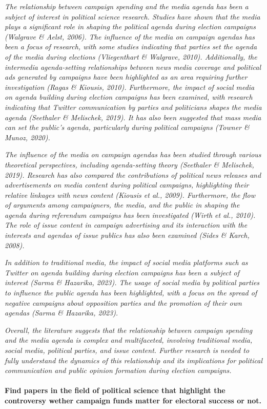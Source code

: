 \documentclass[11pt,a4paper]{article}
\begin{document}
\textit{The relationship between campaign spending and the media agenda has been a subject of interest in political science research. Studies have shown that the media plays a significant role in shaping the political agenda during election campaigns (Walgrave \& Aelst, 2006). The influence of the media on campaign agendas has been a focus of research, with some studies indicating that parties set the agenda of the media during elections (Vliegenthart \& Walgrave, 2010). Additionally, the intermedia agenda-setting relationships between news media coverage and political ads generated by campaigns have been highlighted as an area requiring further investigation (Ragas \& Kiousis, 2010). Furthermore, the impact of social media on agenda building during election campaigns has been examined, with research indicating that Twitter communication by parties and politicians shapes the media agenda (Seethaler \& Melischek, 2019). It has also been suggested that mass media can set the public’s agenda, particularly during political campaigns (Towner \& Munoz, 2020).}

 \textit{The influence of the media on campaign agendas has been studied through various theoretical perspectives, including agenda-setting theory (Seethaler \& Melischek, 2019). Research has also compared the contributions of political news releases and advertisements on media content during political campaigns, highlighting their relative linkages with news content (Kiousis et al., 2009). Furthermore, the flow of arguments among campaigners, the media, and the public in shaping the agenda during referendum campaigns has been investigated (Wirth et al., 2010). The role of issue content in campaign advertising and its interaction with the interests and agendas of issue publics has also been examined (Sides \& Karch, 2008).}

 \textit{In addition to traditional media, the impact of social media platforms such as Twitter on agenda building during election campaigns has been a subject of interest (Sarma \& Hazarika, 2023). The usage of social media by political parties to influence the public agenda has been highlighted, with a focus on the spread of negative campaigns about opposition parties and the promotion of their own agendas (Sarma \& Hazarika, 2023).}

 \textit{Overall, the literature suggests that the relationship between campaign spending and the media agenda is complex and multifaceted, involving traditional media, social media, political parties, and issue content. Further research is needed to fully understand the dynamics of this relationship and its implications for political communication and public opinion formation during election campaigns.}
\\
\\
 \textbf{Find papers in the field of political science that highlight the controversy wether campaign funds matter for electoral success or not.}
\end{document}
